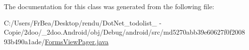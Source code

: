The documentation for this class was generated from the following file:\begin{CompactItemize}
\item 
C:/Users/FrBea/Desktop/rendu/DotNet\_\-todolist\_ - Copie/2doo/\_\-2doo.Android/obj/Debug/android/src/md5270abb39e60627f0f200893b490a1ade/\hyperlink{_forms_view_pager_8java}{FormsViewPager.java}\end{CompactItemize}
